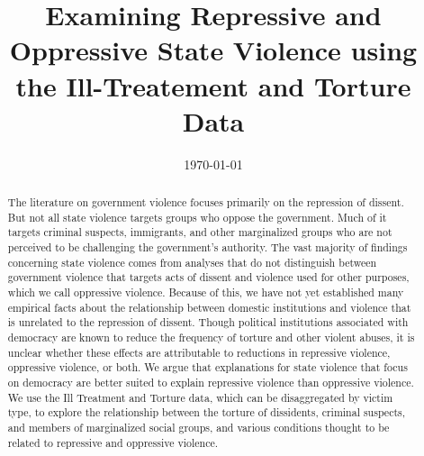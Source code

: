 \documentclass[11pt]{article}
\begin{document}
\date{\today}
\title{Examining Repressive and Oppressive State Violence using the Ill-Treatement and Torture Data}
\author{%
}

\maketitle 

\begin{abstract}
The literature on government violence focuses primarily on the repression of dissent. But not all state violence targets groups who oppose the government. Much of it targets criminal suspects, immigrants, and other marginalized groups who are not perceived to be challenging the government's authority. The vast majority of findings concerning state violence comes from analyses that do not distinguish between government violence that targets acts of dissent and violence used for other purposes, which we call oppressive violence. Because of this, we have not yet established many empirical facts about the relationship between domestic institutions and violence that is unrelated to the repression of dissent. Though political institutions associated with democracy are known to reduce the frequency of torture and other violent abuses, it is unclear whether these effects are attributable to reductions in repressive violence, oppressive violence, or both. We argue that explanations for state violence that focus on democracy are better suited to explain repressive violence than oppressive violence. We use the Ill Treatment and Torture data, which can be disaggregated by victim type, to explore the relationship between the torture of dissidents, criminal suspects, and members of marginalized social groups, and various conditions thought to be related to repressive and oppressive violence. 
\end{abstract}

\clearpage
\setcounter{page}{1}

\doublespace
\end{document}

